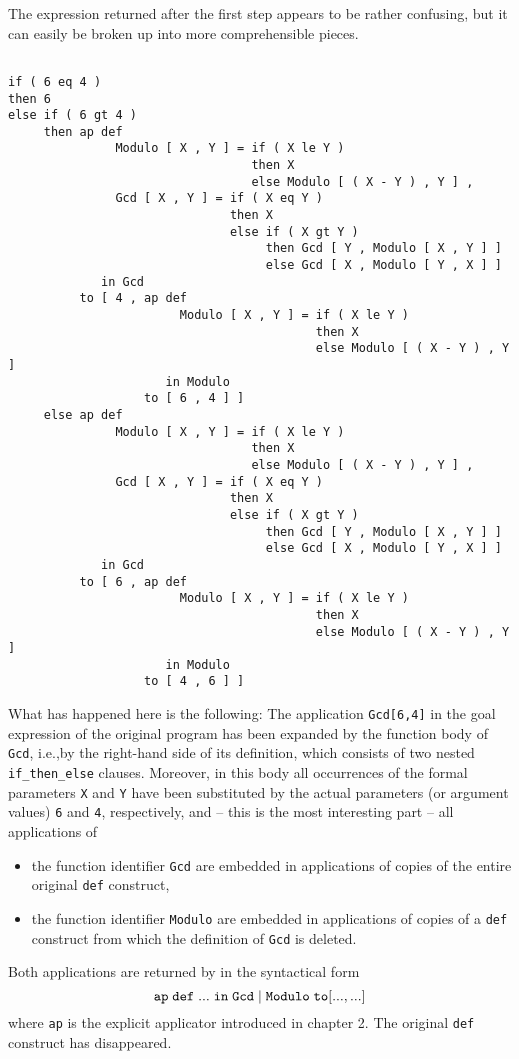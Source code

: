 The expression returned after the first step 
appears to be rather confusing, but it can easily be broken up into more comprehensible pieces.
\begin{verbatim}

if ( 6 eq 4 )
then 6
else if ( 6 gt 4 )
     then ap def 
               Modulo [ X , Y ] = if ( X le Y )
                                  then X
                                  else Modulo [ ( X - Y ) , Y ] ,
               Gcd [ X , Y ] = if ( X eq Y )
                               then X
                               else if ( X gt Y )
                                    then Gcd [ Y , Modulo [ X , Y ] ]
                                    else Gcd [ X , Modulo [ Y , X ] ]
             in Gcd
          to [ 4 , ap def 
                        Modulo [ X , Y ] = if ( X le Y )
                                           then X
                                           else Modulo [ ( X - Y ) , Y ]
                      in Modulo
                   to [ 6 , 4 ] ]
     else ap def 
               Modulo [ X , Y ] = if ( X le Y )
                                  then X
                                  else Modulo [ ( X - Y ) , Y ] ,
               Gcd [ X , Y ] = if ( X eq Y )
                               then X
                               else if ( X gt Y )
                                    then Gcd [ Y , Modulo [ X , Y ] ]
                                    else Gcd [ X , Modulo [ Y , X ] ]
             in Gcd
          to [ 6 , ap def 
                        Modulo [ X , Y ] = if ( X le Y )
                                           then X
                                           else Modulo [ ( X - Y ) , Y ]
                      in Modulo
                   to [ 4 , 6 ] ]

\end{verbatim}
What has happened here is the following:
The application {\tt Gcd[6,4]} in the goal expression of the original program
has been expanded by 
the function body of {\tt Gcd}, i.e.,by the right-hand side of its
definition, which consists of two nested 
{\tt if\_then\_else} clauses. 
Moreover, in this body all occurrences of the formal parameters {\tt X} and
{\tt Y} have been substituted by the actual parameters (or argument values)
{\tt 6} and {\tt 4}, respectively, and -- this is the most interesting part --
 all applications of
\begin{itemize} 
\item the function identifier {\tt Gcd} are embedded in applications of 
copies of the entire original {\tt def} construct,
\item the function identifier {\tt Modulo} are embedded in  applications
of copies of a {\tt def} construct from which
 the definition of {\tt Gcd} is deleted. 
\end{itemize}
Both applications are returned by \pired in the syntactical form
$$
{\tt ap \; def \; ... \; in\; Gcd\; |\; Modulo  \; to [ ..., ...] }
$$
where {\tt ap} is the explicit {\mys applicator} introduced in chapter 2.
The original {\tt def} construct has disappeared.

